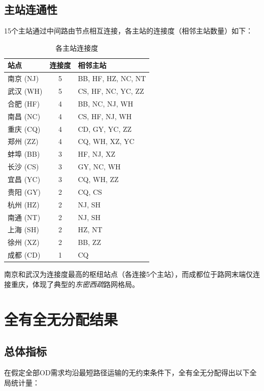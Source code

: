 \documentclass[12pt,a4paper,fontset=none]{ctexart}
\begin{document}
\subsection{主站连通性}

15个主站通过中间路由节点相互连接，各主站的连接度（相邻主站数量）如下：

\begin{table}[H]
\centering
\caption{各主站连接度}
\begin{tabular}{lcl}
\toprule
\textbf{站点} & \textbf{连接度} & \textbf{相邻主站} \\
\midrule
南京 (NJ) & 5 & BB, HF, HZ, NC, NT \\
武汉 (WH) & 5 & CS, HF, NC, YC, ZZ \\
合肥 (HF) & 4 & BB, NC, NJ, WH \\
南昌 (NC) & 4 & CS, HF, NJ, WH \\
重庆 (CQ) & 4 & CD, GY, YC, ZZ \\
郑州 (ZZ) & 4 & CQ, WH, XZ, YC \\
蚌埠 (BB) & 3 & HF, NJ, XZ \\
长沙 (CS) & 3 & GY, NC, WH \\
宜昌 (YC) & 3 & CQ, WH, ZZ \\
贵阳 (GY) & 2 & CQ, CS \\
杭州 (HZ) & 2 & NJ, SH \\
南通 (NT) & 2 & NJ, SH \\
上海 (SH) & 2 & HZ, NT \\
徐州 (XZ) & 2 & BB, ZZ \\
成都 (CD) & 1 & CQ \\
\bottomrule
\end{tabular}
\end{table}

南京和武汉为连接度最高的枢纽站点（各连接5个主站），而成都位于路网末端仅连接重庆，体现了典型的\emph{东密西疏}路网格局。

\section{全有全无分配结果}

\subsection{总体指标}

在假定全部OD需求均沿最短路径运输的无约束条件下，全有全无分配得出以下全局统计量：
\end{document}
